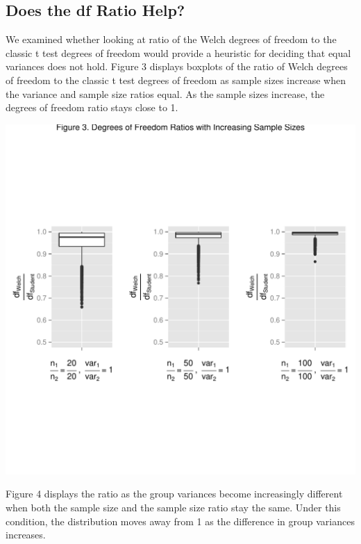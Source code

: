 \documentclass[man,a4paper,noextraspace]{apa6}\usepackage[]{graphicx}\usepackage[]{color}
\makeatletter
\def\maxwidth{ %
  \ifdim\Gin@nat@width>\linewidth
    \linewidth
  \else
    \Gin@nat@width
  \fi
}
\newenvironment{knitrout}{}{} %
\makeatother
\begin{document}
\subsection{Does the df Ratio Help?}
    We examined whether looking at ratio of the Welch degrees of freedom to the classic t test degrees of freedom would provide a heuristic for deciding that equal variances does not hold. Figure 3 displays boxplots of the ratio of Welch degrees of freedom to the classic t test degrees of freedom as sample sizes increase when  the variance and sample size ratios equal. As the sample sizes increase, the degrees of freedom ratio stays close to 1. 

\begin{knitrout}
\color{fgcolor}
\includegraphics[width=\maxwidth]{figure/dfratiosNincrease} 

\end{knitrout}

    Figure 4 displays the ratio as the group variances become increasingly different when both the sample size and the sample size ratio stay the same. Under this condition, the distribution moves away from 1 as the difference in group variances increases.
\end{document}

